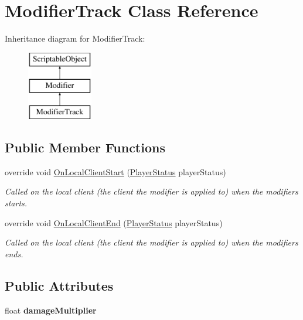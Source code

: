 \hypertarget{class_modifier_track}{}\section{Modifier\+Track Class Reference}
\label{class_modifier_track}
Inheritance diagram for Modifier\+Track\+:\begin{figure}[H]
\begin{center}
\leavevmode
\includegraphics[height=3.000000cm]{class_modifier_track}
\end{center}
\end{figure}
\subsection*{Public Member Functions}
\begin{DoxyCompactItemize}
\item 
override void \hyperlink{class_modifier_track_ab3fb34a4d5f468634ab90837fd4cc3ad}{On\+Local\+Client\+Start} (\hyperlink{class_player_status}{Player\+Status} player\+Status)
\begin{DoxyCompactList}\small\item\em Called on the local client (the client the modifier is applied to) when the modifiers starts. \end{DoxyCompactList}\item 
override void \hyperlink{class_modifier_track_a3a5af2acdd67953efd467e10591a21d4}{On\+Local\+Client\+End} (\hyperlink{class_player_status}{Player\+Status} player\+Status)
\begin{DoxyCompactList}\small\item\em Called on the local client (the client the modifier is applied to) when the modifiers ends. \end{DoxyCompactList}\end{DoxyCompactItemize}
\subsection*{Public Attributes}
\begin{DoxyCompactItemize}
\item 
\hypertarget{class_modifier_track_a63ebeb8c463643f586afa69707fda051}{}\label{class_modifier_track_a63ebeb8c463643f586afa69707fda051} 
float {\bfseries damage\+Multiplier}
\end{DoxyCompactItemize}
